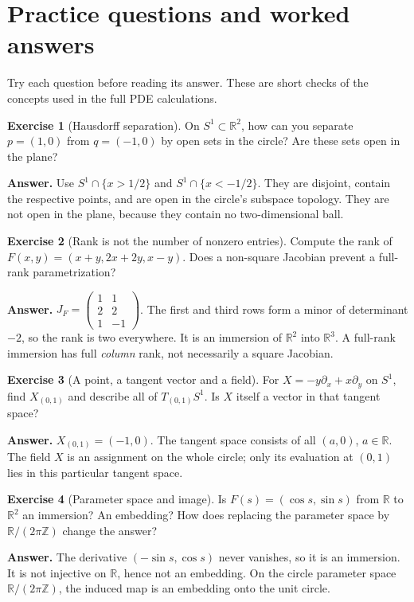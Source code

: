 \documentclass[11pt,a4paper]{article}
\numberwithin{equation}{section}
\theoremstyle{definition}
\newtheorem{exercise}{Exercise}[section]
\theoremstyle{plain}
\theoremstyle{remark}
\newcommand{\R}{\mathbb R}
\begin{document}
\clearpage
\section{Practice questions and worked answers}\label{app:exercises}
Try each question before reading its answer. These are short checks of the concepts used in the full PDE calculations.

\begin{exercise}[Hausdorff separation]
On $S^1\subset\R^2$, how can you separate $p=(1,0)$ from $q=(-1,0)$ by open sets in the circle? Are these sets open in the plane?
\end{exercise}
\textbf{Answer.} Use $S^1\cap\{x>1/2\}$ and $S^1\cap\{x<-1/2\}$. They are disjoint, contain the respective points, and are open in the circle's subspace topology. They are not open in the plane, because they contain no two-dimensional ball.

\begin{exercise}[Rank is not the number of nonzero entries]
Compute the rank of $F(x,y)=(x+y,2x+2y,x-y)$. Does a non-square Jacobian prevent a full-rank parametrization?
\end{exercise}
\textbf{Answer.} $J_F=\left(\begin{smallmatrix}1&1\\2&2\\1&-1\end{smallmatrix}\right)$. The first and third rows form a minor of determinant $-2$, so the rank is two everywhere. It is an immersion of $\R^2$ into $\R^3$. A full-rank immersion has full \emph{column} rank, not necessarily a square Jacobian.

\begin{exercise}[A point, a tangent vector and a field]
For $X=-y\partial_x+x\partial_y$ on $S^1$, find $X_{(0,1)}$ and describe all of $T_{(0,1)}S^1$. Is $X$ itself a vector in that tangent space?
\end{exercise}
\textbf{Answer.} $X_{(0,1)}=(-1,0)$. The tangent space consists of all $(a,0)$, $a\in\R$. The field $X$ is an assignment on the whole circle; only its evaluation at $(0,1)$ lies in this particular tangent space.

\begin{exercise}[Parameter space and image]
Is $F(s)=(\cos s,\sin s)$ from $\R$ to $\R^2$ an immersion? An embedding? How does replacing the parameter space by $\R/(2\pi\mathbb Z)$ change the answer?
\end{exercise}
\textbf{Answer.} The derivative $(-\sin s,\cos s)$ never vanishes, so it is an immersion. It is not injective on $\R$, hence not an embedding. On the circle parameter space $\R/(2\pi\mathbb Z)$, the induced map is an embedding onto the unit circle.
\end{document}

